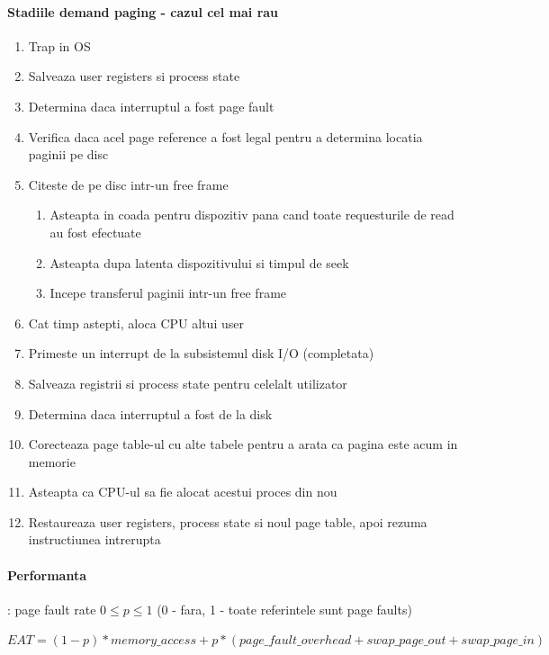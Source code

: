 \documentclass{article}
\begin{document}
\paragraph*{Stadiile demand paging - cazul cel mai rau}
\begin{enumerate}
    \item Trap in OS
    \item Salveaza user registers si process state
    \item Determina daca interruptul a fost page fault
    \item Verifica daca acel page reference a fost legal pentru a determina locatia paginii pe disc
    \item Citeste de pe disc intr-un free frame
    \begin{enumerate}
        \item Asteapta in coada pentru dispozitiv pana cand toate requesturile de read au fost efectuate
        \item Asteapta dupa latenta dispozitivului si timpul de seek
        \item Incepe transferul paginii intr-un free frame
    \end{enumerate}
    \item Cat timp astepti, aloca CPU altui user
    \item Primeste un interrupt de la subsistemul disk I/O (completata)
    \item Salveaza registrii si process state pentru celelalt utilizator
    \item Determina daca interruptul a fost de la disk
    \item Corecteaza page table-ul cu alte tabele pentru a arata ca pagina este acum in memorie
    \item Asteapta ca CPU-ul sa fie alocat acestui proces din nou
    \item Restaureaza user registers, process state si noul page table, apoi rezuma instructiunea intrerupta
\end{enumerate}

\paragraph*{Performanta}: page fault rate $0 \leq p \leq 1$ (0 - fara, 1 - toate referintele sunt page faults)
\begin{center}
    \begin{math}
EAT = (1-p) * memory\_access + p * (page\_fault\_overhead + swap\_page\_out + swap\_page\_in)
    \end{math}
\end{center}
\end{document}
